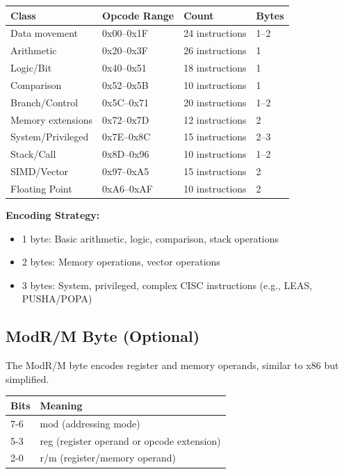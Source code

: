 \documentclass[12pt]{article}
\begin{document}
\begin{table}[h]
\centering
\begin{tabular}{@{}llll@{}}
\toprule
\textbf{Class} & \textbf{Opcode Range} & \textbf{Count} & \textbf{Bytes} \\ \midrule
Data movement & 0x00--0x1F & 24 instructions & 1--2 \\
Arithmetic & 0x20--0x3F & 26 instructions & 1 \\
Logic/Bit & 0x40--0x51 & 18 instructions & 1 \\
Comparison & 0x52--0x5B & 10 instructions & 1 \\
Branch/Control & 0x5C--0x71 & 20 instructions & 1--2 \\
Memory extensions & 0x72--0x7D & 12 instructions & 2 \\
System/Privileged & 0x7E--0x8C & 15 instructions & 2--3 \\
Stack/Call & 0x8D--0x96 & 10 instructions & 1--2 \\
SIMD/Vector & 0x97--0xA5 & 15 instructions & 2 \\
Floating Point & 0xA6--0xAF & 10 instructions & 2 \\ \bottomrule
\end{tabular}
\end{table}

\textbf{Encoding Strategy:}
\begin{itemize}
    \item 1 byte: Basic arithmetic, logic, comparison, stack operations
    \item 2 bytes: Memory operations, vector operations
    \item 3 bytes: System, privileged, complex CISC instructions (e.g., LEAS, PUSHA/POPA)
\end{itemize}

\subsection{ModR/M Byte (Optional)}

The ModR/M byte encodes register and memory operands, similar to x86 but simplified.

\begin{table}[h]
\centering
\begin{tabular}{@{}ll@{}}
\toprule
\textbf{Bits} & \textbf{Meaning} \\ \midrule
7-6 & mod (addressing mode) \\
5-3 & reg (register operand or opcode extension) \\
2-0 & r/m (register/memory operand) \\ \bottomrule
\end{tabular}
\end{table}
\end{document}
